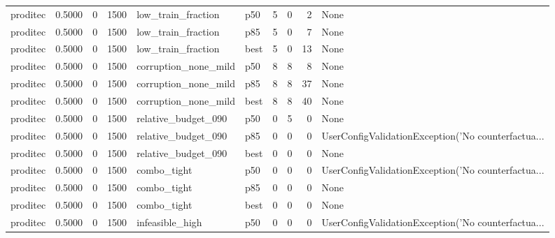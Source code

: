 \begin{tabular}{lrrrllrrrl}
proditec &    0.5000 &    0 &   1500 &   low\_train\_fraction &    p50 &               5 &          0 &       2 &                                               None \\
proditec &    0.5000 &    0 &   1500 &   low\_train\_fraction &    p85 &               5 &          0 &       7 &                                               None \\
proditec &    0.5000 &    0 &   1500 &   low\_train\_fraction &   best &               5 &          0 &      13 &                                               None \\
proditec &    0.5000 &    0 &   1500 & corruption\_none\_mild &    p50 &               8 &          8 &       8 &                                               None \\
proditec &    0.5000 &    0 &   1500 & corruption\_none\_mild &    p85 &               8 &          8 &      37 &                                               None \\
proditec &    0.5000 &    0 &   1500 & corruption\_none\_mild &   best &               8 &          8 &      40 &                                               None \\
proditec &    0.5000 &    0 &   1500 &  relative\_budget\_090 &    p50 &               0 &          5 &       0 &                                               None \\
proditec &    0.5000 &    0 &   1500 &  relative\_budget\_090 &    p85 &               0 &          0 &       0 & UserConfigValidationException('No counterfactua... \\
proditec &    0.5000 &    0 &   1500 &  relative\_budget\_090 &   best &               0 &          0 &       0 &                                               None \\
proditec &    0.5000 &    0 &   1500 &          combo\_tight &    p50 &               0 &          0 &       0 & UserConfigValidationException('No counterfactua... \\
proditec &    0.5000 &    0 &   1500 &          combo\_tight &    p85 &               0 &          0 &       0 &                                               None \\
proditec &    0.5000 &    0 &   1500 &          combo\_tight &   best &               0 &          0 &       0 &                                               None \\
proditec &    0.5000 &    0 &   1500 &      infeasible\_high &    p50 &               0 &          0 &       0 & UserConfigValidationException('No counterfactua... \\

\end{tabular}
